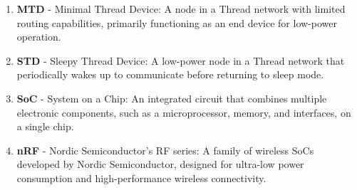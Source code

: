 \begin{enumerate}
    \item \textbf{MTD} - Minimal Thread Device: A node in a Thread network with limited routing capabilities, primarily functioning as an end device for low-power operation.
    \item \textbf{STD} - Sleepy Thread Device: A low-power node in a Thread network that periodically wakes up to communicate before returning to sleep mode.
    \item \textbf{SoC} - System on a Chip: An integrated circuit that combines multiple electronic components, such as a microprocessor, memory, and interfaces, on a single chip.
    \item \textbf{nRF} - Nordic Semiconductor's RF series: A family of wireless SoCs developed by Nordic Semiconductor, designed for ultra-low power consumption and high-performance wireless connectivity.
\end{enumerate}
